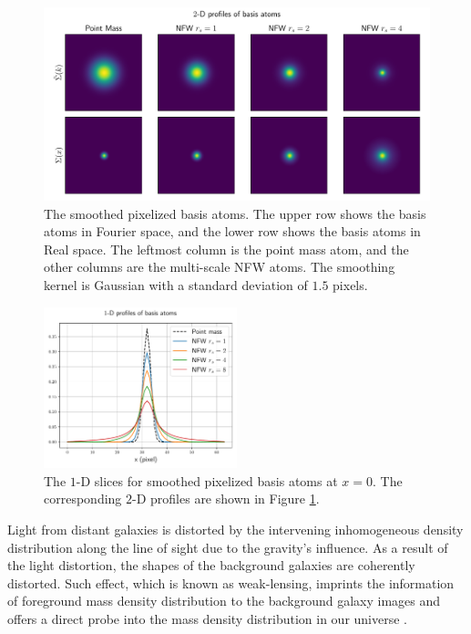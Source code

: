 \documentclass[twocolumn]{aastex62}
\begin{document}
\begin{figure}[!t] \includegraphics[width=1.\textwidth]{nfwlet-atom-2D.pdf}
    \caption{The smoothed pixelized basis atoms. The upper row shows the basis
        atoms in Fourier space, and the lower row shows the basis atoms in Real
        space.  The leftmost column is the point mass atom, and the other
        columns are the multi-scale NFW atoms.  The smoothing kernel is
        Gaussian with a standard deviation of $1.5$ pixels.
        } \label{fig-atoms2D}
\end{figure}

\begin{figure}
 \includegraphics[width=0.5\textwidth]{nfwlet-atom-1D.pdf}
    \caption{The $1$-D slices for smoothed pixelized basis atoms at $x=0$. The
        corresponding $2$-D profiles are shown in Figure \ref{fig-atoms2D}.
        }
 \label{fig-atoms1D}
\end{figure}

Light from distant galaxies is distorted by the intervening inhomogeneous
density distribution along the line of sight due to the gravity's influence.
As a result of the light distortion, the shapes of the background galaxies are
coherently distorted. Such effect, which is known as weak-lensing, imprints the
information of foreground mass density distribution to the background galaxy
images and offers a direct probe into the mass density distribution in our
universe \citep[see][for recent reviews]{revKilbinger15,revRachel17}.
\end{document}
